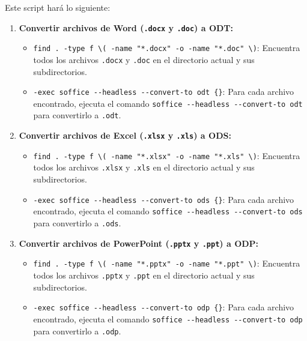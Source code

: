 \documentclass[
  jou,
  floatsintext,
  longtable,
  a4paper,
  nolmodern,
  notxfonts,
  notimes,
  12pt,
  colorlinks=true,linkcolor=blue,citecolor=blue,urlcolor=blue]{apa7}
\providecommand{\tightlist}{%
  \setlength{\itemsep}{0pt}\setlength{\parskip}{0pt}}
\begin{document}
Este script hará lo siguiente:

\begin{enumerate}
\def\labelenumi{\arabic{enumi}.}
\tightlist
\item
  \textbf{Convertir archivos de Word (\texttt{.docx} y \texttt{.doc}) a
  ODT:}

  \begin{itemize}
  \tightlist
  \item
    \texttt{find\ .\ -type\ f\ \textbackslash{}(\ -name\ "*.docx"\ -o\ -name\ "*.doc"\ \textbackslash{})}:
    Encuentra todos los archivos \texttt{.docx} y \texttt{.doc} en el
    directorio actual y sus subdirectorios.
  \item
    \texttt{-exec\ soffice\ -\/-headless\ -\/-convert-to\ odt\ \{\}}:
    Para cada archivo encontrado, ejecuta el comando
    \texttt{soffice\ -\/-headless\ -\/-convert-to\ odt} para convertirlo
    a \texttt{.odt}.
  \end{itemize}
\item
  \textbf{Convertir archivos de Excel (\texttt{.xlsx} y \texttt{.xls}) a
  ODS:}

  \begin{itemize}
  \tightlist
  \item
    \texttt{find\ .\ -type\ f\ \textbackslash{}(\ -name\ "*.xlsx"\ -o\ -name\ "*.xls"\ \textbackslash{})}:
    Encuentra todos los archivos \texttt{.xlsx} y \texttt{.xls} en el
    directorio actual y sus subdirectorios.
  \item
    \texttt{-exec\ soffice\ -\/-headless\ -\/-convert-to\ ods\ \{\}}:
    Para cada archivo encontrado, ejecuta el comando
    \texttt{soffice\ -\/-headless\ -\/-convert-to\ ods} para convertirlo
    a \texttt{.ods}.
  \end{itemize}
\item
  \textbf{Convertir archivos de PowerPoint (\texttt{.pptx} y
  \texttt{.ppt}) a ODP:}

  \begin{itemize}
  \tightlist
  \item
    \texttt{find\ .\ -type\ f\ \textbackslash{}(\ -name\ "*.pptx"\ -o\ -name\ "*.ppt"\ \textbackslash{})}:
    Encuentra todos los archivos \texttt{.pptx} y \texttt{.ppt} en el
    directorio actual y sus subdirectorios.
  \item
    \texttt{-exec\ soffice\ -\/-headless\ -\/-convert-to\ odp\ \{\}}:
    Para cada archivo encontrado, ejecuta el comando
    \texttt{soffice\ -\/-headless\ -\/-convert-to\ odp} para convertirlo
    a \texttt{.odp}.
  \end{itemize}
\end{enumerate}
\end{document}
